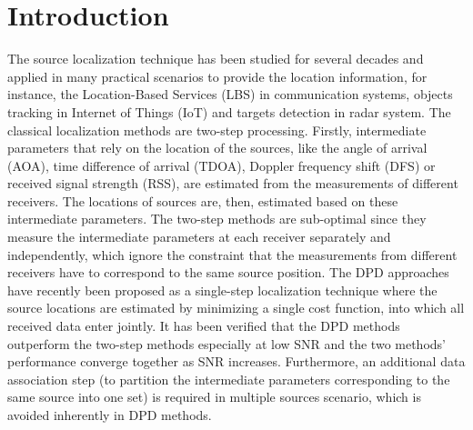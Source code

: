 \documentclass[review]{elsarticle}
\begin{document}
\linenumbers
\section{Introduction}
The source localization technique has been studied for several decades and applied in many practical scenarios to provide the location information, for instance, the Location-Based Services (LBS) in communication systems, objects tracking in Internet of Things (IoT) and targets detection in radar system. 
The classical localization methods are two-step processing. Firstly, intermediate parameters that rely on the location of the sources, like the angle of arrival (AOA), time difference of arrival (TDOA), Doppler frequency shift (DFS) or received signal strength (RSS), are estimated from the measurements of different receivers. The locations of sources are, then, estimated based on these intermediate parameters. The two-step methods are sub-optimal since they measure the intermediate parameters at each receiver separately and independently, which ignore the constraint that the measurements from different receivers have to correspond to the same source position. 
The DPD approaches have recently been proposed as a single-step localization technique where the source locations are estimated by minimizing a single cost function, into which all received data enter jointly. It has been verified that the DPD methods outperform the two-step methods especially at low SNR and the two methods' performance converge together as SNR increases. Furthermore, an additional data association step (to partition the intermediate parameters corresponding to the same source into one set) is required in multiple sources scenario, which is avoided inherently in DPD methods. 
\end{document}
